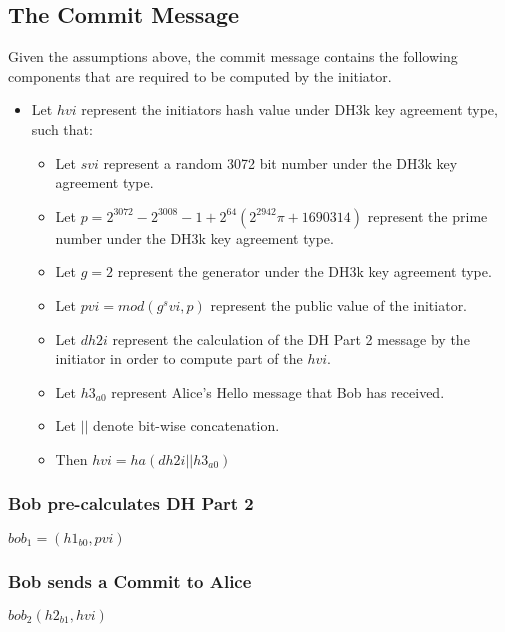 \documentclass[11pt]{article}
\begin{document}
  \subsection{The Commit Message} \label{commit}
  Given the assumptions above, the commit message contains the following
  components that are required to be computed by the initiator.
  \begin{itemize}
    \item Let $hvi$ represent the initiators hash value under DH3k key
      agreement type, such that:
      \begin{itemize}
        \item Let $svi$ represent a random 3072 bit number under the DH3k key
              agreement type.
        \item Let $p = 2^{3072} - 2^3008 - 1 + 2^64(2^2942\pi + 1690314)$ represent
              the prime number under the DH3k key agreement type.
        \item Let $g = 2$ represent the generator under the DH3k key agreement
              type.
        \item Let $pvi = mod(g^svi, p)$ represent the public value of the
              initiator. 
        \item Let $dh2i$ represent the calculation of the DH Part 2 message
              by the initiator in order to compute part of the $hvi$.
        \item Let $h3_{a0}$ represent Alice's Hello message that Bob has
              received.
        \item Let $||$ denote bit-wise concatenation.
        \item Then $hvi = ha(dh2i||h3_{a0})$ 
      \end{itemize}
  \end{itemize}
  \subsubsection{Bob pre-calculates DH Part 2}
  $bob_1=(h1_{b0},pvi)$
  \subsubsection{Bob sends a Commit to Alice}
  $bob_2(h2_{b1},hvi)$
\end{document}
